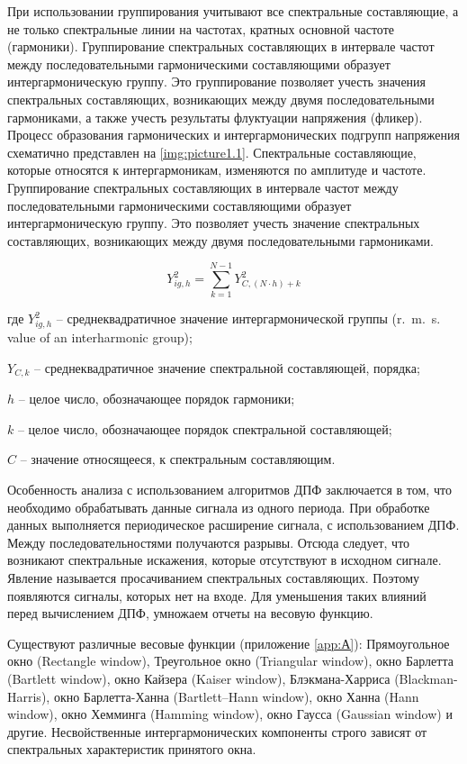 При использовании группирования учитывают все спектральные составляющие, а не только спектральные линии на частотах, кратных основной частоте (гармоники). Группирование спектральных составляющих в интервале частот между последовательными гармоническими составляющими образует интергармоническую группу. Это группирование позволяет учесть значения спектральных составляющих, возникающих между двумя последовательными гармониками, а также учесть результаты флуктуации напряжения (фликер). Процесс образования гармонических и интергармонических подгрупп напряжения схематично представлен на \ref{img:picture1.1}.
Спектральные составляющие, которые относятся к интергармоникам, изменяются по амплитуде и частоте. Группирование спектральных составляющих в интервале частот между последовательными гармоническими составляющими образует интергармоническую группу. Это позволяет учесть значение спектральных составляющих, возникающих между двумя последовательными гармониками.

\begin{equation}
	\label{eq:equation1.7}
	Y_{ig,h}^2 = \displaystyle\sum_{k=1}^{N-1} Y_{C,(N \cdot h)+k}^2 
\end{equation}  

где $Y_{ig,h}^2$ – среднеквадратичное значение интергармонической группы (r.~m.~s. value of an interharmonic group);

$Y_{C,k}$ – среднеквадратичное значение спектральной составляющей, порядка;

$h$ – целое число, обозначающее порядок гармоники;

$k$ – целое число, обозначающее порядок спектральной составляющей;

$C$ – значение относящееся, к спектральным составляющим. 

Особенность анализа с использованием алгоритмов ДПФ заключается в том, что необходимо обрабатывать данные сигнала из одного периода. При обработке данных выполняется периодическое расширение сигнала, с использованием ДПФ. Между последовательностями получаются разрывы. Отсюда следует, что возникают спектральные искажения, которые отсутствуют в исходном сигнале. Явление называется просачиванием спектральных составляющих. Поэтому появляются сигналы, которых нет на входе. Для уменьшения таких влияний перед вычислением ДПФ, умножаем отчеты на весовую функцию. 

Существуют различные весовые функции (приложение \ref{app:А}): Прямоугольное окно (Rectangle window), Треугольное окно (Triangular window), окно Барлетта (Bartlett window), окно Кайзера (Kaiser window), Блэкмана-Харриса (Blackman-Harris), окно Барлетта-Ханна (Bartlett–Hann window), окно Ханна (Hann window), окно Хемминга (Hamming window), окно Гаусса (Gaussian window) и другие. Несвойственные интергармонических компоненты строго зависят от спектральных характеристик принятого окна.
 
